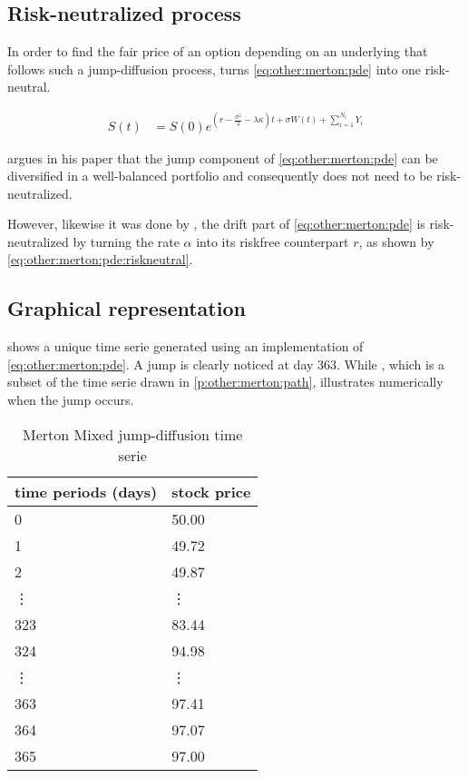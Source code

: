 \documentclass[a4paper, 12pt]{report}
\newcommand{\Bm}{W\left(t\right)}
\newcommand{\St}{S\left(t\right)}
\begin{document}
\subsection{Risk-neutralized process}
\label{sub:other:merton:risk}

In order to find the fair price of an option depending on an underlying that follows such a jump-diffusion process, \citet{merton76} turns \cref{eq:other:merton:pde} into one risk-neutral.

\begin{align}
  \St &= S\left(0\right) e^{\left(r - \frac{\sigma^2}{2} - \lambda \kappa\right) t + \sigma \Bm + \sum_{i=1}^{N_t} Y_i}
  \label{eq:other:merton:pde:riskneutral}
\end{align}

\citet{merton76} argues in his paper that the jump component of \cref{eq:other:merton:pde} can be diversified in a well-balanced portfolio and consequently does not need to be risk-neutralized.

However, likewise it was done by \citet{bs}, the drift part of \cref{eq:other:merton:pde} is risk-neutralized by turning the rate $\alpha$ into its riskfree counterpart $r$, as shown by \cref{eq:other:merton:pde:riskneutral}.



\subsection{Graphical representation}
\label{sub:other:merton:graphical}   

 shows a unique time serie generated using an implementation of \cref{eq:other:merton:pde}. A jump is clearly noticed at day 363. While
, which is a subset of the time serie drawn in \cref{p:other:merton:path}, illustrates numerically when the jump occurs.

\begin{table}[ht]
\centering
\begin{tabular}{ll}
  \hline
 time periods (days)& stock price\\ 
  \hline
  0   &50.00 \\ 
  1   &49.72 \\ 
  2   &49.87 \\ 
  \vdots & \vdots \\
  323 &83.44 \\ 
  324 &94.98 \\ 
  \vdots & \vdots \\
  363 &97.41 \\ 
  364 &97.07 \\ 
  365 &97.00 \\ 
   \hline
\end{tabular}
\caption{Merton Mixed jump-diffusion time serie}
\label{t:other:merton:path}
\end{table}
\end{document}
